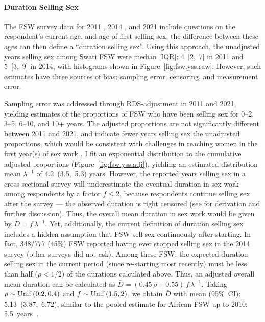 \paragraph{Duration Selling Sex}
The FSW survey data for 2011 \cite{Baral2014}, 2014 \cite{EswKP2014}, and 2021 \cite{EswIBBS2022}
include questions on the respondent's current age, and age of first selling sex;
the difference between these ages can then define a ``duration selling sex''.
Using this approach, the unadjusted years selling sex among Swati FSW were
median [IQR]: 4~[2,~7] in 2011 and 5~[3,~9] in 2014,
with histograms shown in Figure~\ref{fig:fsw.yss.raw}.
However, such estimates have three sources of bias:
sampling error, censoring, and measurement error.
\par
Sampling error was addressed through RDS-adjustment in 2011 and 2021,
yielding estimates of the proportions of FSW
who have been selling sex for 0--2, 3--5, 6--10, and 10+ years.
The adjusted proportions are not significantly different between 2011 and 2021, and
indicate fewer years selling sex \vs the unadjusted proportions, which would be consistent with
challenges in reaching women in the first year(s) of sex work \cite{Cheuk2020}.
I fit an exponential distribution to the cumulative adjusted proportions
(Figure~\ref{fig:fsw.yss.adj}), yielding an estimated distribution mean
${\lambda}^{-1}$ of 4.2~(3.5,~5.3) years.
However, the reported years selling sex in a cross sectional survey
will underestimate the eventual duration in sex work among respondents by a factor $f \le 2$,
because respondents continue selling sex after the survey
--- \ie the observed duration is right censored
(see  for derivation and further discussion).
Thus, the overall mean duration in sex work would be given by $\bar{D} = f\,\lambda^{-1}$.
Yet, additionally, the current definition of duration selling sex
includes a hidden assumption that FSW sell sex continuously after starting.
In fact, 348/777 (45\%) FSW reported having ever stopped selling sex
in the 2014 survey \cite{EswKP2014} (other surveys did not ask).
Among these FSW, the expected duration selling sex in the current period
(\ie since re-starting most recently)
must be less than half ($\rho < 1/2$) of the durations calculated above.
Thus, an adjusted overall mean duration can be calculated as
$\bar{D} = (0.45\,\rho + 0.55)\,f\,\lambda^{-1}$.
Taking $\rho \sim \operatorname{Unif}\,(0.2,0.4)$ and $f \sim \operatorname{Unif}\,(1.5,2)$,
we obtain $\bar{D}$ with mean (95\%~CI): 5.13~(3.87,~6.72),
similar to the pooled estimate for African FSW up to 2010: 5.5~years~\cite{Fazito2012}.
